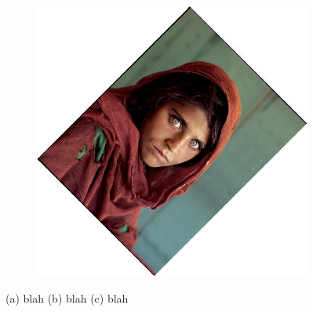 \documentclass{article}
\begin{document}
\begin{figure}[H]
\begin{subfigure}{.3\textwidth}
        \subcaption{}
    \end{subfigure}
    \begin{subfigure}{.3\textwidth}
        \centering
        \includegraphics[scale=0.04]{q1/output/similar_0.5_2_2.jpg}
        \subcaption{}
    \end{subfigure}
    \caption{(a) blah (b) blah (c) blah}
\end{figure}
\end{document}
